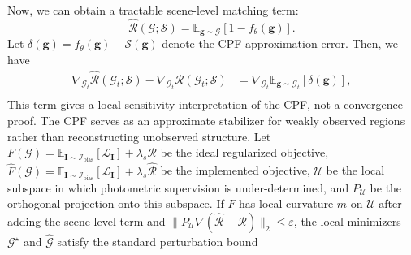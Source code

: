 \documentclass[lettersize,journal]{IEEEtran}
\begin{document}
Now, we can obtain a tractable scene-level matching term:
\begin{equation}
    \widehat{\mathcal{R}}(\mathcal{G};\mathcal{S}) = \mathbb{E}_{\mathbf{g} \sim \mathcal{G}} \left[ 1 - f_{\theta} (\mathbf{g}) \right].
    \label{eq11}
\end{equation}
Let $\delta(\mathbf{g})= f_{\theta} (\mathbf{g}) - \mathcal{S} (\mathbf{g})$ denote the CPF approximation error. Then, we have
\begin{equation}
    \begin{aligned}
    \nabla_{\mathcal{G}_t} \widehat{\mathcal{R}}(\mathcal{G}_t;\mathcal{S}) - \nabla_{\mathcal{G}_t} \mathcal{R}(\mathcal{G}_t;\mathcal{S}) &= \nabla_{\mathcal{G}_t} \mathbb{E}_{\mathbf{g} \sim \mathcal{G}_t} \left[ \delta(\mathbf{g}) \right], \\
    \end{aligned}
    \label{eq12}
\end{equation}
This term gives a local sensitivity interpretation of the CPF, not a convergence proof. The CPF serves as an approximate stabilizer for weakly observed regions rather than reconstructing unobserved structure. Let $F(\mathcal{G})=\mathbb{E}_{\mathbf{I}\sim\mathcal{I}_{\text{bias}}}[\mathcal{L}_{\mathbf{I}}]+\lambda_s\mathcal{R}$ be the ideal regularized objective, $\widehat F(\mathcal{G})=\mathbb{E}_{\mathbf{I}\sim\mathcal{I}_{\text{bias}}}[\mathcal{L}_{\mathbf{I}}]+\lambda_s\widehat{\mathcal{R}}$ be the implemented objective, $\mathcal{U}$ be the local subspace in which photometric supervision is under-determined, and $P_{\mathcal{U}}$ be the orthogonal projection onto this subspace. If $F$ has local curvature $m$ on $\mathcal{U}$ after adding the scene-level term and $\|P_{\mathcal{U}}\nabla(\widehat{\mathcal{R}}-\mathcal{R})\|_2\le \varepsilon$, the local minimizers $\mathcal{G}^{\star}$ and $\widehat{\mathcal{G}}$ satisfy the standard perturbation bound
\end{document}
